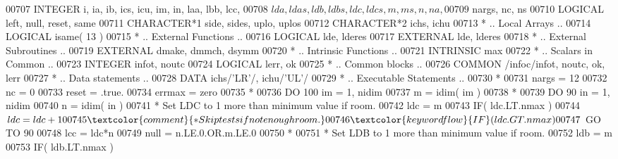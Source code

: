 \begin{DoxyCode}
00707       \textcolor{keywordtype}{INTEGER}            i, ia, ib, ics, icu, im, in, laa, lbb, lcc,
00708      $                   lda, ldas, ldb, ldbs, ldc, ldcs, m, ms, n, na,
00709      $                   nargs, nc, ns
00710       \textcolor{keywordtype}{LOGICAL}            left, null, reset, same
00711       \textcolor{keywordtype}{CHARACTER*1}        side, sides, uplo, uplos
00712       \textcolor{keywordtype}{CHARACTER*2}        ichs, ichu
00713 \textcolor{comment}{*     .. Local Arrays ..}
00714       \textcolor{keywordtype}{LOGICAL}            isame( 13 )
00715 \textcolor{comment}{*     .. External Functions ..}
00716       \textcolor{keywordtype}{LOGICAL}            lde, lderes
00717       \textcolor{keywordtype}{EXTERNAL}           lde, lderes
00718 \textcolor{comment}{*     .. External Subroutines ..}
00719       \textcolor{keywordtype}{EXTERNAL}           dmake, dmmch, dsymm
00720 \textcolor{comment}{*     .. Intrinsic Functions ..}
00721       \textcolor{keywordtype}{INTRINSIC}          max
00722 \textcolor{comment}{*     .. Scalars in Common ..}
00723       \textcolor{keywordtype}{INTEGER}            infot, noutc
00724       \textcolor{keywordtype}{LOGICAL}            lerr, ok
00725 \textcolor{comment}{*     .. Common blocks ..}
00726       \textcolor{keyword}{COMMON}             /infoc/infot, noutc, ok, lerr
00727 \textcolor{comment}{*     .. Data statements ..}
00728       \textcolor{keyword}{DATA}               ichs/\textcolor{stringliteral}{'LR'}/, ichu/\textcolor{stringliteral}{'UL'}/
00729 \textcolor{comment}{*     .. Executable Statements ..}
00730 \textcolor{comment}{*}
00731       nargs = 12
00732       nc = 0
00733       reset = .true.
00734       errmax = zero
00735 \textcolor{comment}{*}
00736       \textcolor{keywordflow}{DO} 100 im = 1, nidim
00737          m = idim( im )
00738 \textcolor{comment}{*}
00739          \textcolor{keywordflow}{DO} 90 in = 1, nidim
00740             n = idim( in )
00741 \textcolor{comment}{*           Set LDC to 1 more than minimum value if room.}
00742             ldc = m
00743             \textcolor{keywordflow}{IF}( ldc.LT.nmax )
00744      $         ldc = ldc + 1
00745 \textcolor{comment}{*           Skip tests if not enough room.}
00746             \textcolor{keywordflow}{IF}( ldc.GT.nmax )
00747      $         \textcolor{keywordflow}{GO TO} 90
00748             lcc = ldc*n
00749             null = n.LE.0.OR.m.LE.0
00750 \textcolor{comment}{*}
00751 \textcolor{comment}{*           Set LDB to 1 more than minimum value if room.}
00752             ldb = m
00753             \textcolor{keywordflow}{IF}( ldb.LT.nmax )

\end{DoxyCode}

